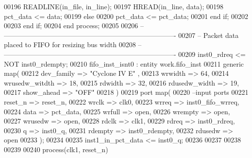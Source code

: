 \begin{DoxyCode}
00196          \textcolor{vhdlchar}{READLINE}\textcolor{vhdlchar}{(}\textcolor{vhdlchar}{in\_file}\textcolor{vhdlchar}{,} \textcolor{vhdlchar}{in\_line}\textcolor{vhdlchar}{)};
00197          \textcolor{vhdlchar}{HREAD}\textcolor{vhdlchar}{(}\textcolor{vhdlchar}{in\_line}\textcolor{vhdlchar}{,} \textcolor{vhdlchar}{data}\textcolor{vhdlchar}{)};
00198          \textcolor{vhdlchar}{pct_data} \textcolor{vhdlchar}{<=} \textcolor{vhdlchar}{data};
00199       \textcolor{keywordflow}{else} 
00200          \textcolor{vhdlchar}{pct_data} \textcolor{vhdlchar}{<=} \textcolor{vhdlchar}{pct_data};
00201       \textcolor{keywordflow}{end} \textcolor{keywordflow}{if};
00202 
00203    \textcolor{keywordflow}{end} \textcolor{keywordflow}{if};
00204 \textcolor{keywordflow}{end} \textcolor{keywordflow}{process};
00205 
00206 \textcolor{keyword}{-- ----------------------------------------------------------------------------}
00207 \textcolor{keyword}{-- Packet data placed to FIFO for resizing bus width}
00208 \textcolor{keyword}{-- ----------------------------------------------------------------------------}
00209 inst0\_rdreq <= \textcolor{keywordflow}{NOT} inst0\_rdempty;
00210 fifo\_inst\_isnt0 : \textcolor{keywordflow}{entity} work.fifo_inst
00211       \textcolor{keywordflow}{generic} \textcolor{keywordflow}{map}(
00212          dev_family      =>  \textcolor{keyword}{"Cyclone IV E"}  ,
00213          wrwidth         => \textcolor{vhdllogic}{64},
00214          wrusedw_witdth  => \textcolor{vhdllogic}{18},
00215          rdwidth         => \textcolor{vhdllogic}{32},
00216          rdusedw_width   => \textcolor{vhdllogic}{19},
00217          show_ahead      => \textcolor{keyword}{"OFF"}
00218       \textcolor{vhdlchar}{)} 
00219       \textcolor{keywordflow}{port} \textcolor{keywordflow}{map}(
00220 \textcolor{keyword}{         --input ports }
00221          reset_n       => reset_n,
00222          wrclk         => clk0,
00223          wrreq         => inst0_fifo_wrreq,
00224          data          => pct_data,
00225          wrfull        => \textcolor{keywordflow}{open},
00226          wrempty       => \textcolor{keywordflow}{open},
00227          wrusedw       => \textcolor{keywordflow}{open},
00228          rdclk         => clk1,
00229          rdreq         => inst0_rdreq,
00230          q             => inst0_q,
00231          rdempty       => inst0_rdempty,
00232          rdusedw       => \textcolor{keywordflow}{open}          
00233          \textcolor{vhdlchar}{)};
00234 
00235 inst1\_in\_pct\_data <= inst0\_q;
00236 
00237 
00238 
00239    
00240 \textcolor{keywordflow}{process}(clk1, reset_n)

\end{DoxyCode}
